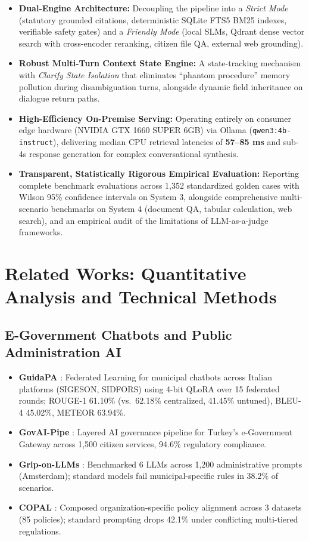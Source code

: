 \documentclass[11pt,a4paper]{article}
\begin{document}
\begin{itemize}
\item \textbf{Dual-Engine Architecture:} Decoupling the pipeline into a \emph{Strict Mode} (statutory
grounded citations, deterministic SQLite FTS5 BM25 indexes, verifiable safety gates) and a
\emph{Friendly Mode} (local SLMs, Qdrant dense vector search with cross-encoder reranking, citizen file
QA, external web grounding).
\item \textbf{Robust Multi-Turn Context State Engine:} A state-tracking mechanism with \emph{Clarify
State Isolation} that eliminates ``phantom procedure'' memory pollution during disambiguation turns,
alongside dynamic field inheritance on dialogue return paths.
\item \textbf{High-Efficiency On-Premise Serving:} Operating entirely on consumer edge hardware
(NVIDIA GTX 1660 SUPER 6GB) via Ollama (\texttt{qwen3:4b-instruct}), delivering median CPU retrieval
latencies of \textbf{57--85 ms} and sub-4s response generation for complex conversational synthesis.
\item \textbf{Transparent, Statistically Rigorous Empirical Evaluation:} Reporting complete benchmark
evaluations across 1,352 standardized golden cases with Wilson 95\% confidence intervals on System 3,
alongside comprehensive multi-scenario benchmarks on System 4 (document QA, tabular calculation, web
search), and an empirical audit of the limitations of LLM-as-a-judge frameworks.
\end{itemize}

\section{Related Works: Quantitative Analysis and Technical Methods}

\subsection{E-Government Chatbots and Public Administration AI}
\begin{itemize}
\item \textbf{GuidaPA} \cite{guidapa}: Federated Learning for municipal chatbots across Italian
platforms (SIGESON, SIDFORS) using 4-bit QLoRA over 15 federated rounds; ROUGE-1 61.10\% (vs.\ 62.18\%
centralized, 41.45\% untuned), BLEU-4 45.02\%, METEOR 63.94\%.
\item \textbf{GovAI-Pipe} \cite{govaipipe}: Layered AI governance pipeline for Turkey's e-Government
Gateway across 1,500 citizen services, 94.6\% regulatory compliance.
\item \textbf{Grip-on-LLMs} \cite{griponllms}: Benchmarked 6 LLMs across 1,200 administrative prompts
(Amsterdam); standard models fail municipal-specific rules in 38.2\% of scenarios.
\item \textbf{COPAL} \cite{copal}: Composed organization-specific policy alignment across 3 datasets
(85 policies); standard prompting drops 42.1\% under conflicting multi-tiered regulations.
\end{itemize}
\end{document}

